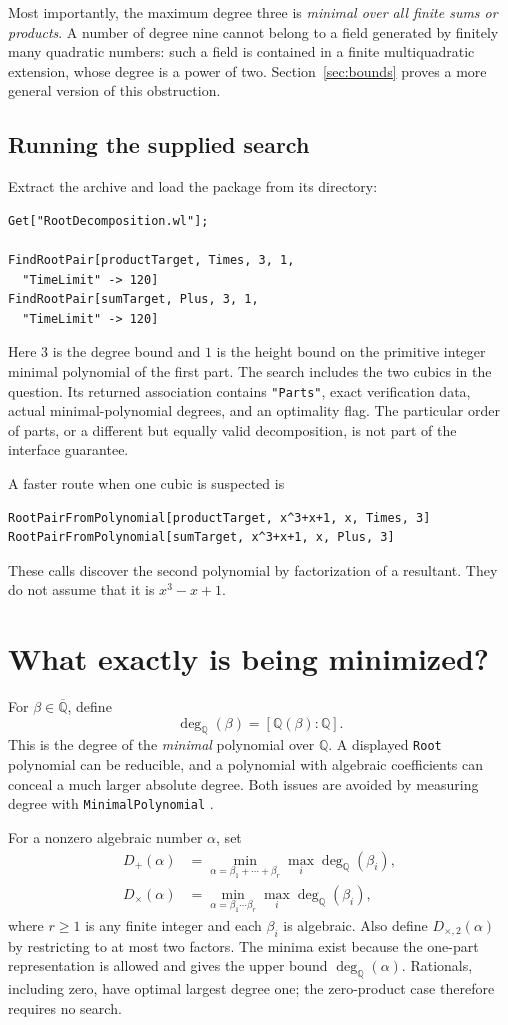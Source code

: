 \documentclass[11pt,a4paper]{article}
\theoremstyle{definition}\newtheorem{definition}[theorem]{Definition}
\theoremstyle{remark}\newtheorem{remark}[theorem]{Remark}
\newcommand{\Q}{\mathbb{Q}}\newcommand{\C}{\mathbb{C}}
\newcommand{\Qbar}{\overline{\mathbb{Q}}}
\newcommand{\degQ}{\deg_{\Q}}
\newcommand{\code}[1]{\texttt{#1}}
\begin{document}
Most importantly, the maximum degree three is \emph{minimal over all finite sums or products}. A number of degree nine cannot belong to a field generated by finitely many quadratic numbers: such a field is contained in a finite multiquadratic extension, whose degree is a power of two. Section~\ref{sec:bounds} proves a more general version of this obstruction.

\subsection{Running the supplied search}
Extract the archive and load the package from its directory:
\begin{lstlisting}
Get["RootDecomposition.wl"];

FindRootPair[productTarget, Times, 3, 1,
  "TimeLimit" -> 120]
FindRootPair[sumTarget, Plus, 3, 1,
  "TimeLimit" -> 120]
\end{lstlisting}
Here $3$ is the degree bound and $1$ is the height bound on the primitive integer minimal polynomial of the first part. The search includes the two cubics in the question. Its returned association contains \code{"Parts"}, exact verification data, actual minimal-polynomial degrees, and an optimality flag. The particular order of parts, or a different but equally valid decomposition, is not part of the interface guarantee.

A faster route when one cubic is suspected is
\begin{lstlisting}
RootPairFromPolynomial[productTarget, x^3+x+1, x, Times, 3]
RootPairFromPolynomial[sumTarget, x^3+x+1, x, Plus, 3]
\end{lstlisting}
These calls discover the second polynomial by factorization of a resultant. They do not assume that it is $x^3-x+1$.

\section{What exactly is being minimized?}
For $\beta\in\Qbar$, define
\[
\degQ(\beta)=[\Q(\beta):\Q].
\]
This is the degree of the \emph{minimal} polynomial over $\Q$. A displayed \code{Root} polynomial can be reducible, and a polynomial with algebraic coefficients can conceal a much larger absolute degree. Both issues are avoided by measuring degree with \code{MinimalPolynomial} \cite{minimalpoly}.

For a nonzero algebraic number $\alpha$, set
\begin{align*}
D_+(\alpha)&=\min_{\alpha=\beta_1+\cdots+\beta_r}
                 \max_i\degQ(\beta_i),\\
D_{\times}(\alpha)&=\min_{\alpha=\beta_1\cdots\beta_r}
                 \max_i\degQ(\beta_i),
\end{align*}
where $r\geq1$ is any finite integer and each $\beta_i$ is algebraic. Also define $D_{\times,2}(\alpha)$ by restricting to at most two factors. The minima exist because the one-part representation is allowed and gives the upper bound $\degQ(\alpha)$. Rationals, including zero, have optimal largest degree one; the zero-product case therefore requires no search.
\end{document}
